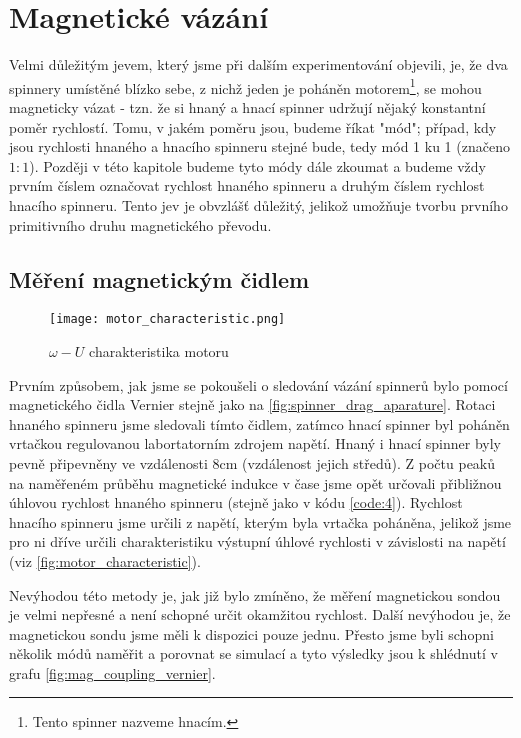 \chapter{Magnetické vázání}

Velmi důležitým jevem, který jsme při dalším experimentování objevili, je, že dva spinnery umístěné blízko sebe, z nichž jeden je poháněn motorem\footnote{Tento spinner nazveme hnacím.}, se mohou magneticky vázat - tzn. že si hnaný a hnací spinner udržují nějaký konstantní poměr rychlostí.
Tomu, v jakém poměru jsou, budeme říkat "mód"; případ, kdy jsou rychlosti hnaného a hnacího spinneru stejné bude, tedy mód 1 ku 1 (značeno $1:1$). Později v této kapitole budeme tyto módy dále zkoumat a budeme vždy prvním číslem označovat rychlost hnaného spinneru a druhým číslem rychlost hnacího spinneru. Tento jev je obvzlášť důležitý, jelikož umožňuje tvorbu prvního primitivního druhu magnetického převodu.

\section{Měření magnetickým čidlem}

\begin{wrapfigure}{r}{0.5\textwidth}
    \texttt{[image: motor\_characteristic.png]}
    \centering
    \caption[$\omega - U$ charakteristika motoru]{$\omega - U$ charakteristika motoru}
    \label{fig:motor_characteristic}
\end{wrapfigure}

Prvním způsobem, jak jsme se pokoušeli o sledování vázání spinnerů bylo pomocí magnetického čidla Vernier stejně jako na \autoref{fig:spinner_drag_aparature}. Rotaci hnaného spinneru jsme sledovali tímto čidlem, zatímco hnací spinner byl poháněn vrtačkou regulovanou labortatorním zdrojem napětí. Hnaný i hnací spinner byly pevně připevněny ve vzdálenosti 8cm (vzdálenost jejich středů).
Z počtu peaků na naměřeném průběhu magnetické indukce v čase jsme opět určovali přibližnou úhlovou rychlost hnaného spinneru (stejně jako v kódu \ref{code:4}). Rychlost hnacího spinneru jsme určili z napětí, kterým byla vrtačka poháněna, jelikož jsme pro ni dříve určili charakteristiku výstupní úhlové rychlosti v závislosti na napětí (viz \autoref{fig:motor_characteristic}).

Nevýhodou této metody je, jak již bylo zmíněno, že měření magnetickou sondou je velmi nepřesné a není schopné určit okamžitou rychlost. Další nevýhodou je, že magnetickou sondu jsme měli k dispozici pouze jednu. Přesto jsme byli schopni několik módů naměřit a porovnat se simulací a tyto výsledky jsou k shlédnutí v grafu \ref{fig:mag_coupling_vernier}.

